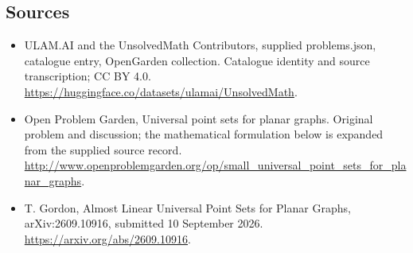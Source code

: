 \documentclass[11pt,a4paper]{article}
\begin{document}
\subsection{Sources}
\begin{itemize}
\item[S1] ULAM.AI and the UnsolvedMath Contributors, supplied problems.json, catalogue entry, OpenGarden collection. Catalogue identity and source transcription; CC BY 4.0.
\url{https://huggingface.co/datasets/ulamai/UnsolvedMath}.
\item[S2] Open Problem Garden, Universal point sets for planar graphs. Original problem and discussion; the mathematical formulation below is expanded from the supplied source record.
\url{http://www.openproblemgarden.org/op/small_universal_point_sets_for_planar_graphs}.

\item[R1] T. Gordon, Almost Linear Universal Point Sets for Planar Graphs,
arXiv:2609.10916, submitted 10 September 2026.
\url{https://arxiv.org/abs/2609.10916}.

\end{itemize}
\end{document}
